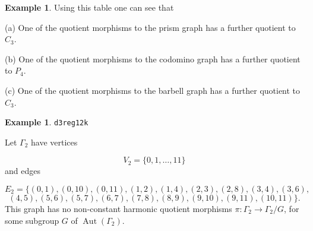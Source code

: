 \documentclass[12pt,letterpaper]{article}
\theoremstyle{definition}
\newtheorem{example}[theorem]{Example}
\DeclareMathOperator{\Aut}{Aut}
\begin{document}
\begin{example}
{Using this table one can see that

(a) One of the quotient morphisms to the prism graph has a further
quotient to $C_3$.

(b) One of the quotient morphisms to the codomino graph has a further
quotient to $P_4$.

(c) One of the quotient morphisms to the barbell graph has a further
quotient to $C_3$.
}
\end{example}



\begin{example}%
\label{example:d3reg12k}
  {\tt d3reg12k}\newline
{\rm  
Let $\Gamma_2$ have vertices

\[
V_2=\{0,1,\dots,11\}
\]
and edges

\[
E_2 = \{
(0, 1), (0, 10), (0, 11), (1, 2), (1, 4), (2, 3), (2, 8), (3, 4), (3, 6),
\]
\[
(4, 5), (5, 6), (5, 7), (6, 7), (7, 8), (8, 9), (9, 10), (9, 11), (10, 11)
\}.
\]
This graph has no non-constant harmonic quotient
morphisms $\pi: \Gamma_2\to \Gamma_2/G$, for some subgroup
$G$ of $\Aut(\Gamma_2)$.

}
\end{example}
\end{document}
